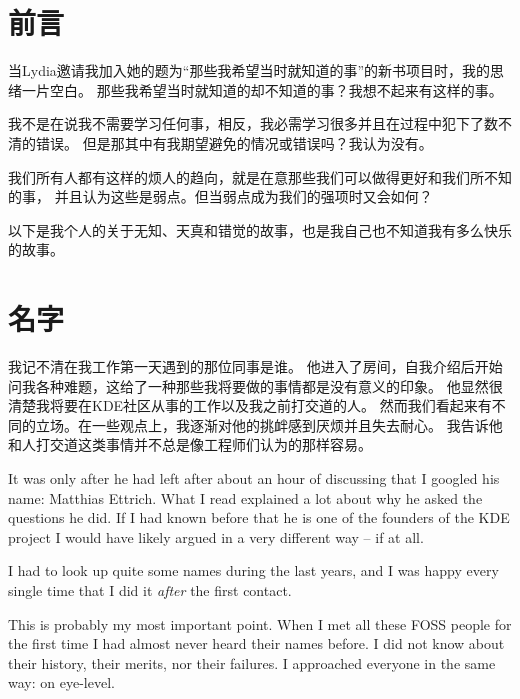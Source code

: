 

\section*{前言}

当Lydia邀请我加入她的题为“那些我希望当时就知道的事”的新书项目时，我的思绪一片空白。
那些我希望当时就知道的却不知道的事？我想不起来有这样的事。

我不是在说我不需要学习任何事，相反，我必需学习很多并且在过程中犯下了数不清的错误。
但是那其中有我期望避免的情况或错误吗？我认为没有。

我们所有人都有这样的烦人的趋向，就是在意那些我们可以做得更好和我们所不知的事，
并且认为这些是弱点。但当弱点成为我们的强项时又会如何？

以下是我个人的关于无知、天真和错觉的故事，也是我自己也不知道我有多么快乐的故事。

\section*{名字}

我记不清在我工作第一天遇到的那位同事是谁。
他进入了房间，自我介绍后开始问我各种难题，这给了一种那些我将要做的事情都是没有意义的印象。
他显然很清楚我将要在KDE社区从事的工作以及我之前打交道的人。
然而我们看起来有不同的立场。在一些观点上，我逐渐对他的挑衅感到厌烦并且失去耐心。
我告诉他和人打交道这类事情并不总是像工程师们认为的那样容易。

It was only after he had left after about an hour of discussing that I googled
his name: Matthias Ettrich. What I read explained a lot about why he asked the
questions he did. If I had known before that he is one of the founders of the
KDE project I would have likely argued in a very different way -- if at all.

I had to look up quite some names during the last years, and I was happy every
single time that I did it \textit{after} the first contact.

This is probably my most important point. When I met all these FOSS people for
the first time I had almost never heard their names before. I did not know about
their history, their merits, nor their failures. I approached everyone in the
same way: on eye-level. 

